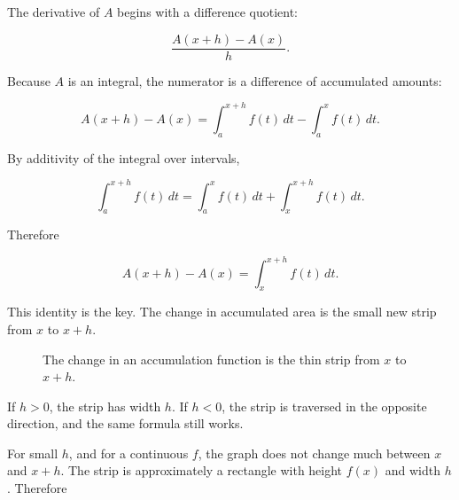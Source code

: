 The derivative of \(A\) begins with a difference quotient:

\[
\frac{A(x+h)-A(x)}{h}.
\]

Because \(A\) is an integral, the numerator is a difference of accumulated amounts:

\[
A(x+h)-A(x)
=
\int_a^{x+h} f(t)\,dt-\int_a^x f(t)\,dt.
\]

By additivity of the integral over intervals,

\[
\int_a^{x+h} f(t)\,dt
=
\int_a^x f(t)\,dt+\int_x^{x+h} f(t)\,dt.
\]

Therefore

\[
\boxed{
A(x+h)-A(x)=\int_x^{x+h} f(t)\,dt.
}
\]

This identity is the key.  The change in accumulated area is the small new strip from
\(x\) to \(x+h\).

\begin{figure}[h]
\centering
{}
\caption{The change in an accumulation function is the thin strip from \(x\) to \(x+h\).}
\label{fig:accumulation-change-strip}
\end{figure}

If \(h>0\), the strip has width \(h\).  If \(h<0\), the strip is traversed in the opposite
direction, and the same formula still works.

For small \(h\), and for a continuous \(f\), the graph does not change much between
\(x\) and \(x+h\).  The strip is approximately a rectangle with height \(f(x)\) and width
\(h\).  Therefore

